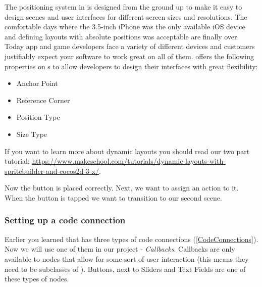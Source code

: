 \begin{details}
 \label{PositioningSystem}
The positioning system in \cocos{} is designed from the ground up to make it
easy to design scenes and user interfaces for different screen sizes and
resolutions. The comfortable days where the 3.5-inch iPhone was the only 
available iOS device and defining layouts with absolute positions was acceptable
are finally over. Today app and game developers face a variety of different
devices and customers justifiably expect your software to work great on all of
them. \cocos{} offers the following properties on \ccnode{}s to allow developers
to design their interfaces with great flexibility:

\begin{itemize}
  \item Anchor Point
  \item Reference Corner
  \item Position Type
  \item Size Type
\end{itemize}

If you want to learn more about dynamic layouts you should read our two part
tutorial:
\url{https://www.makeschool.com/tutorials/dynamic-layouts-with-spritebuilder-and-cocos2d-3-x/}.
\end{details}

Now the button is placed correctly. Next, we want to assign an action to it.
When the button is tapped we want to transition to our second scene.

\subsubsection{Setting up a code connection}

Earlier you learned that \SB{} has three types of code connections 
(\ref{CodeConnections}). Now we will use one of them in our project -
\textit{Callbacks}. Callbacks are only
available to nodes that allow for some sort of user interaction (this means they need to be subclasses of
). Buttons, next to Sliders and Text Fields are one of
these types of nodes. 

